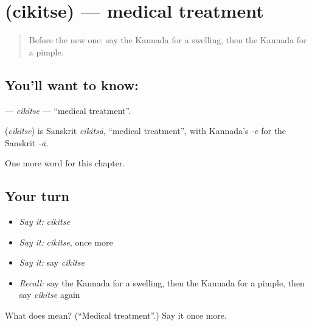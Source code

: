 \section[\texorpdfstring{\kn{ಚಿಕಿತ್ಸೆ} (cikitse)}{ಚಿಕಿತ್ಸೆ (cikitse)}]{ (cikitse) — medical treatment}

\label{lesson:KA-C245-cikitse}



\begin{quote}
Before the new one: say the Kannada for a swelling, then the Kannada for a pimple.
\end{quote}

\subsection*{You'll want to know: }
\textbf{} — \emph{cikitse} — \textquotedblleft{}medical treatment\textquotedblright{}.

\begin{cousinweb}
\textbf{} (\emph{cikitse}) is Sanskrit \emph{cikitsā}, \textquotedblleft{}medical treatment\textquotedblright{}, with Kannada's \emph{-e} for the Sanskrit \emph{-ā}.
\end{cousinweb}

\begin{grammarlens}[title={What you've built}]
One more word for this chapter.
\end{grammarlens}

\subsection*{Your turn}
\begin{itemize}
\raggedright
  \item \emph{Say it:} \emph{cikitse}
  \item \emph{Say it:} \emph{cikitse}, once more
  \item \emph{Say it:} say \emph{cikitse}
  \item \emph{Recall:} say the Kannada for a swelling, then the Kannada for a pimple, then say \emph{cikitse} again
\end{itemize}

\begin{tcolorbox}[breakable,colback=teal!4,colframe=teal!35!black,title={Before you move on}]
What does  mean? (\textquotedblleft{}Medical treatment\textquotedblright{}.) Say it once more.
\end{tcolorbox}

